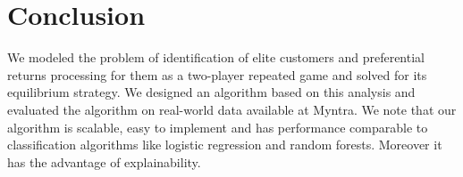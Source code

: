 \section{Conclusion}
We modeled the problem of identification of elite customers and preferential returns processing for them as a two-player repeated game and solved for its equilibrium strategy. We designed an algorithm based on this analysis and evaluated the algorithm on real-world data available at Myntra. We note that our algorithm is scalable, easy to implement and has performance comparable to classification algorithms like logistic regression and random forests. Moreover it has the advantage of explainability.